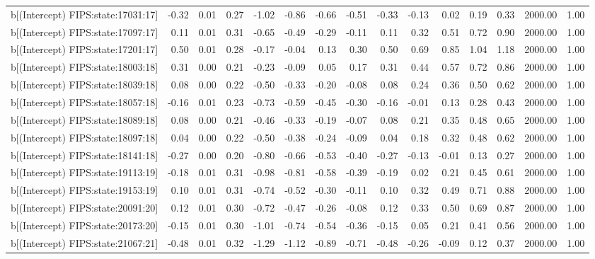 \begin{table}[ht]
\begin{tabular}{rrrrrrrrrrrrrrr}
  b[(Intercept) FIPS:state:17031:17] & -0.32 & 0.01 & 0.27 & -1.02 & -0.86 & -0.66 & -0.51 & -0.33 & -0.13 & 0.02 & 0.19 & 0.33 & 2000.00 & 1.00 \\ 
  b[(Intercept) FIPS:state:17097:17] & 0.11 & 0.01 & 0.31 & -0.65 & -0.49 & -0.29 & -0.11 & 0.11 & 0.32 & 0.51 & 0.72 & 0.90 & 2000.00 & 1.00 \\ 
  b[(Intercept) FIPS:state:17201:17] & 0.50 & 0.01 & 0.28 & -0.17 & -0.04 & 0.13 & 0.30 & 0.50 & 0.69 & 0.85 & 1.04 & 1.18 & 2000.00 & 1.00 \\ 
  b[(Intercept) FIPS:state:18003:18] & 0.31 & 0.00 & 0.21 & -0.23 & -0.09 & 0.05 & 0.17 & 0.31 & 0.44 & 0.57 & 0.72 & 0.86 & 2000.00 & 1.00 \\ 
  b[(Intercept) FIPS:state:18039:18] & 0.08 & 0.00 & 0.22 & -0.50 & -0.33 & -0.20 & -0.08 & 0.08 & 0.24 & 0.36 & 0.50 & 0.62 & 2000.00 & 1.00 \\ 
  b[(Intercept) FIPS:state:18057:18] & -0.16 & 0.01 & 0.23 & -0.73 & -0.59 & -0.45 & -0.30 & -0.16 & -0.01 & 0.13 & 0.28 & 0.43 & 2000.00 & 1.00 \\ 
  b[(Intercept) FIPS:state:18089:18] & 0.08 & 0.00 & 0.21 & -0.46 & -0.33 & -0.19 & -0.07 & 0.08 & 0.21 & 0.35 & 0.48 & 0.65 & 2000.00 & 1.00 \\ 
  b[(Intercept) FIPS:state:18097:18] & 0.04 & 0.00 & 0.22 & -0.50 & -0.38 & -0.24 & -0.09 & 0.04 & 0.18 & 0.32 & 0.48 & 0.62 & 2000.00 & 1.00 \\ 
  b[(Intercept) FIPS:state:18141:18] & -0.27 & 0.00 & 0.20 & -0.80 & -0.66 & -0.53 & -0.40 & -0.27 & -0.13 & -0.01 & 0.13 & 0.27 & 2000.00 & 1.00 \\ 
  b[(Intercept) FIPS:state:19113:19] & -0.18 & 0.01 & 0.31 & -0.98 & -0.81 & -0.58 & -0.39 & -0.19 & 0.02 & 0.21 & 0.45 & 0.61 & 2000.00 & 1.00 \\ 
  b[(Intercept) FIPS:state:19153:19] & 0.10 & 0.01 & 0.31 & -0.74 & -0.52 & -0.30 & -0.11 & 0.10 & 0.32 & 0.49 & 0.71 & 0.88 & 2000.00 & 1.00 \\ 
  b[(Intercept) FIPS:state:20091:20] & 0.12 & 0.01 & 0.30 & -0.72 & -0.47 & -0.26 & -0.08 & 0.12 & 0.33 & 0.50 & 0.69 & 0.87 & 2000.00 & 1.00 \\ 
  b[(Intercept) FIPS:state:20173:20] & -0.15 & 0.01 & 0.30 & -1.01 & -0.74 & -0.54 & -0.36 & -0.15 & 0.05 & 0.21 & 0.41 & 0.56 & 2000.00 & 1.00 \\ 
  b[(Intercept) FIPS:state:21067:21] & -0.48 & 0.01 & 0.32 & -1.29 & -1.12 & -0.89 & -0.71 & -0.48 & -0.26 & -0.09 & 0.12 & 0.37 & 2000.00 & 1.00 \\ 

\end{tabular}
\end{table}
